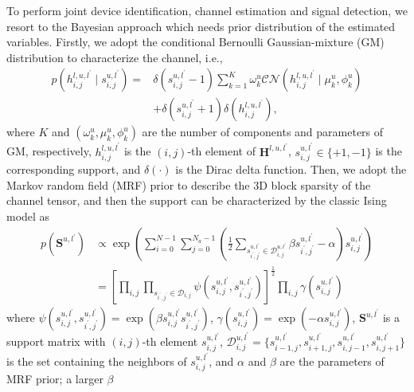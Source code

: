 \documentclass[conference]{IEEEtran}
\begin{document}
    To perform joint device identification, channel estimation and signal detection, we resort to the Bayesian approach which needs prior distribution of the estimated variables. Firstly, we adopt the conditional Bernoulli Gaussian-mixture (GM) distribution to characterize the channel, i.e.,
    \begin{align}
    	\label{hprior}
    	p\left(h_{i, j}^{l, u, l^{\prime}} \mid s_{i, j}^{u, l^{\prime}} \right) = 
    	&\delta\left(s_{i, j}^{u, l^{\prime}}-1\right) \sum_{k=1}^K \omega_k^u \mathcal{CN}\left(h_{i, j}^{l, u, l^{\prime}}\mid \mu^u_k, \phi^u_k\right) \nonumber \\
    	&+ \delta\left(s_{i, j}^{u, l^{\prime}}+1\right) \delta\left(h_{i, j}^{l, u, l^{\prime}}\right),
    \end{align}  
	where $K$ and $(\omega_k^u, \mu^u_k, \phi^u_k)$ are the number of components and parameters of GM, respectively, $h_{i, j}^{l, u, l^{\prime}}$ is the $(i,j)$-th element of $\mathbf H^{l,u,l^{\prime}}$, $s_{i, j}^{u, l^{\prime}} \in \{+1,-1\}$ is the corresponding support, and $\delta(\cdot)$ is the Dirac delta function. Then, we adopt the Markov random field (MRF) prior to describe the 3D block sparsity of the channel tensor, and then the support can be characterized by the classic Ising model as
	\begin{align}
	\label{sprior}
		p\left(\mathbf{S}^{u, l^{\prime}}\right) 
		&\propto \exp \left(\sum_{i=0}^{N-1} \sum_{j=0}^{N_a-1}\left(\frac{1}{2} \sum_{s_{i^{\prime}, j^{\prime}}^{u, l^{\prime}} \in \mathcal D_{i, j}^{u, l^{\prime}}} \beta s_{i^{\prime}, j^{\prime}}^{u, l^{\prime}}-\alpha\right) s_{i, j}^{u, l^{\prime}}\right)
		\nonumber \\
		&=\left[\prod_{i,j}\prod_{s_{i^{\prime}, j^{\prime}} \in \mathcal D_{i, j}}  
		\psi(s_{i,j}^{u,l^{\prime}}, s_{i^{\prime}, j^{\prime}}^{u, l^{\prime}})\right]^{\frac{1}{2}}
		\prod_{i,j}\gamma(s_{i,j}^{u,l^{\prime}})
	\end{align}
where $\psi(s_{i,j}^{u,l^{\prime}}, s_{i^{\prime}, j^{\prime}}^{u, l^{\prime}}) = \exp(\beta s_{i, j}^{u, l^{\prime}}
s_{i^{\prime}, j^{\prime}}^{u, l^{\prime}})$,
$\gamma(s_{i,j}^{u,l^{\prime}}) = \exp(-\alpha s_{i, j}^{u, l^{\prime}})$,
$\mathbf S^{u, l^{\prime}}$ is a support matrix with $(i,j)$-th element $s_{i, j}^{u, l^{\prime}}$, $\mathcal D_{i,j}^{u, l^{\prime}} = \{ s_{i-1,j}^{u,l^{\prime}}, s_{i+1,j}^{u,l^{\prime}}, s_{i,j-1}^{u,l^{\prime}}, s_{i,j+1}^{u,l^{\prime}} \}$ is the set containing the neighbors of $s_{i,j}^{u,l^{\prime}}$, and $\alpha$ and $\beta$ are the parameters of MRF prior; a larger $\beta$
\end{document}
